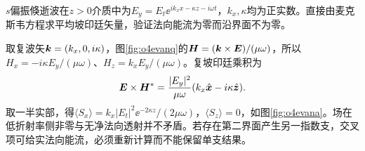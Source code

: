 \begin{example}\label{ex:o4evanescentflux}
$s$偏振倏逝波在$z>0$介质中为$E_y=E_t\ee^{ik_xx-\kappa z-i\omega t}$，$k_x,\kappa$均为正实数。直接由麦克斯韦方程求平均坡印廷矢量，验证法向能流为零而沿界面不为零。
\end{example}
\begin{solution}
取复波矢$\bm{k}=(k_x,0,i\kappa)$，图\ref{fig:o4evanq}的$\bm{H}=(\bm{k}\times\bm{E})/(\mu\omega)$，所以$H_x=-i\kappa E_y/(\mu\omega)$、$H_z=k_xE_y/(\mu\omega)$。复坡印廷乘积为
\[
 \bm{E}\times\bm{H}^*
 =\frac{|E_y|^2}{\mu\omega}(k_x\hat{\bm{x}}-i\kappa\hat{\bm{z}}).
\]
取一半实部，得$\langle S_x\rangle=k_x|E_t|^2\ee^{-2\kappa z}/(2\mu\omega)$，$\langle S_z\rangle=0$，如图\ref{fig:o4evana}。场在低折射率侧非零与无净法向透射并不矛盾。若存在第二界面产生另一指数支，交叉项可给实法向能流，必须重新计算而不能保留单支结果。
\end{solution}
